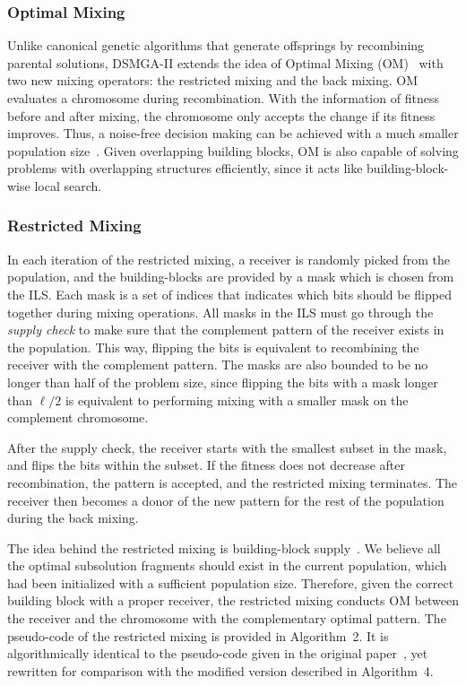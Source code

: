\subsubsection{Optimal Mixing}
Unlike canonical genetic algorithms that generate offsprings by recombining parental solutions, DSMGA-II extends the idea of Optimal Mixing (OM)~\cite{thierens:OM} with two new mixing operators: the restricted mixing and the back mixing. OM evaluates a chromosome during recombination. With the information of fitness before and after mixing, the chromosome only accepts the change if its fitness improves. Thus, a noise-free decision making can be achieved with a much smaller population size~\cite{goldberg:buildingblock}. Given overlapping building blocks, OM is also capable of solving problems with overlapping structures efficiently, since it acts like building-block-wise local search.


\subsubsection{Restricted Mixing}

In each iteration of the restricted mixing, a receiver is randomly picked from the population, and the building-blocks are provided by a mask which is chosen from the ILS. 
Each mask is a set of indices that indicates which bits should be flipped together during mixing operations. 
All masks in the ILS must go through the \textit{supply check} to make sure that the complement pattern of the receiver exists in the population. 
This way, flipping the bits is equivalent to recombining the receiver with the complement pattern. 
The masks are also bounded to be no longer than half of the problem size, since flipping the bits with a mask longer than $\ell/2$ is equivalent to performing mixing with a smaller mask on the complement chromosome. 


After the supply check, the receiver starts with the smallest subset in the mask, and flips the bits within the subset. 
If the fitness does not decrease after recombination, the pattern is accepted, and the restricted mixing terminates. 
The receiver then becomes a donor of the new pattern for the rest of the population during the back mixing. 


The idea behind the restricted mixing is building-block supply~\cite{goldberg:buildingblock}. We believe all the optimal subsolution fragments should exist in the current population, which had been initialized with a sufficient population size. Therefore, given the correct building block with a proper receiver, the restricted mixing conducts OM between the receiver and the chromosome with the complementary optimal pattern. 
The pseudo-code of the restricted mixing is provided in Algorithm~2.
It is algorithmically identical to the pseudo-code given in the original paper~\cite{hsu:DSMGA2}, yet rewritten for comparison with the modified version described in Algorithm~4. 


